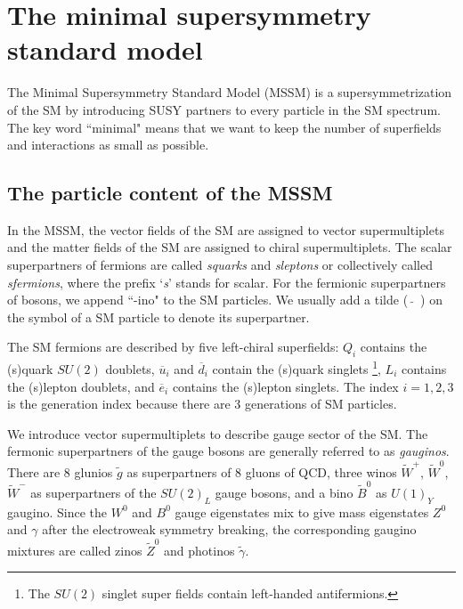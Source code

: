 \documentclass[12pt]{report}
\begin{document}
\chapter{The minimal supersymmetry standard model}
The Minimal Supersymmetry Standard Model (MSSM) is a supersymmetrization of the SM by introducing SUSY partners to every particle in the SM spectrum. 
The key word ``minimal" means that we want to keep the number of superfields and interactions as small as possible. 



\section{The particle content of the MSSM}
In the MSSM, the vector fields of the SM are assigned to vector supermultiplets and the matter fields of the SM are assigned to chiral supermultiplets.
The scalar superpartners of fermions are called \textit{squarks} and \textit{sleptons} or collectively called \textit{sfermions}, where the prefix `\textit{s}' stands for scalar.
For the fermionic superpartners of bosons, we append ``-ino" to the SM particles.
We usually add a tilde ($\widetilde{ \quad }$) on the symbol of a SM particle to denote its superpartner.

The SM fermions are described by five left-chiral superfields: $Q_{i}$ contains the (s)quark $SU(2)$ doublets, $\overline{u}_{i}$  and $\overline{d}_{i}$ contain the (s)quark singlets \footnote{The $SU(2)$ singlet super fields contain left-handed antifermions.}, $L_{i}$ contains the (s)lepton doublets, and $\overline{e}_{i}$ contains the (s)lepton singlets.
The index $i = 1, 2, 3$ is the generation index because there are 3 generations of SM particles.

We introduce vector supermultiplets to describe gauge sector of the SM.
The fermonic superpartners of the gauge bosons are generally referred to as \textit{gauginos}.
There are 8 glunios $\widetilde{g}$ as superpartners of 8 gluons of QCD, three winos $\widetilde{W}^{+}$, $\widetilde{W}^{0}$, $\widetilde{W}^{-}$ as superpartners of the $SU(2)_{L}$ gauge bosons, and a bino $\widetilde{B}^{0}$ as $U(1)_{Y}$ gaugino.
Since the $W^{0}$ and $B^{0}$ gauge eigenstates mix to give mass eigenstates $Z^{0}$ and $\gamma$ after the electroweak symmetry breaking, the corresponding gaugino mixtures are called zinos $\widetilde{Z}^{0}$ and photinos $\widetilde{\gamma}$.
\end{document}
